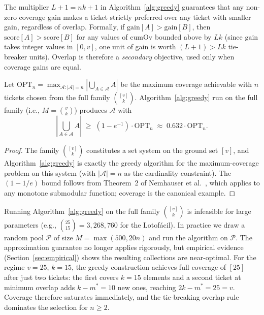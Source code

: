 \begin{remark}
  The multiplier $L+1 = nk+1$ in Algorithm~\ref{alg:greedy} guarantees that
  any non-zero coverage gain makes a ticket strictly preferred over any ticket
  with smaller gain, regardless of overlap.  Formally, if $\mathrm{gain}[A]
  > \mathrm{gain}[B]$, then $\mathrm{score}[A] > \mathrm{score}[B]$ for
  any values of $\mathrm{cumOv}$ bounded above by $Lk$ (since
  $\mathrm{gain}$ takes integer values in $[0, v]$, one unit of gain is
  worth $(L+1) > Lk$ tie-breaker units).  Overlap is therefore a
  \emph{secondary} objective, used only when coverage gains are equal.
\end{remark}

\begin{theorem}
  \label{thm:greedy-guarantee}
  Let $\mathrm{OPT}_n = \max_{\mathcal{A}: |\mathcal{A}|=n}
  |\bigcup_{A \in \mathcal{A}} A|$ be the maximum coverage achievable with
  $n$ tickets chosen from the full family $\binom{[v]}{k}$.
  Algorithm~\ref{alg:greedy} run on the full family (i.e., $M =
  \binom{v}{k}$) produces $\mathcal{A}$ with
  \[
    \left|\bigcup_{A \in \mathcal{A}} A\right|
    \;\ge\; \left(1 - e^{-1}\right) \cdot \mathrm{OPT}_n
    \;\approx\; 0.632 \cdot \mathrm{OPT}_n.
  \]
\end{theorem}

\begin{proof}
  The family $\binom{[v]}{k}$ constitutes a set system on the ground set
  $[v]$, and Algorithm~\ref{alg:greedy} is exactly the greedy algorithm for
  the maximum-coverage problem on this system (with $|\mathcal{A}| = n$ as
  the cardinality constraint).  The $(1-1/e)$ bound follows from Theorem~2
  of Nemhauser et al.\ \cite{Nemhauser1978}, which applies to any monotone
  submodular function; coverage is the canonical example.
\end{proof}

\begin{remark}
  Running Algorithm~\ref{alg:greedy} on the full family $\binom{[v]}{k}$
  is infeasible for large parameters (e.g., $\binom{25}{15} =
  3{,}268{,}760$ for the Lotofácil).  In practice we draw a random pool
  $\mathcal{P}$ of size $M = \max(500, 20n)$ and run the algorithm on
  $\mathcal{P}$.  The approximation guarantee no longer applies rigorously,
  but empirical evidence (Section~\ref{sec:empirical}) shows the resulting
  collections are near-optimal.  For the regime $v=25$, $k=15$, the greedy
  construction achieves full coverage of $[25]$ after just two tickets:
  the first covers $k = 15$ elements and a second ticket at minimum
  overlap adds $k - m^* = 10$ new ones, reaching $2k - m^* = 25 = v$.
  Coverage therefore saturates immediately, and the tie-breaking overlap
  rule dominates the selection for $n \ge 2$.
\end{remark}

